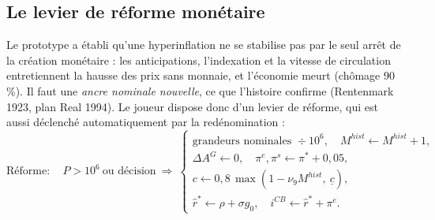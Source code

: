 \documentclass[11pt,a4paper]{article}
\begin{document}
\subsection{Le levier de réforme monétaire}
\label{sec:reforme}
Le prototype a établi qu'une hyperinflation ne se stabilise pas par le seul arrêt de la création monétaire : les anticipations, l'indexation et la vitesse de circulation entretiennent la hausse des prix sans monnaie, et l'économie meurt (chômage 90\,\%). Il faut une \emph{ancre nominale nouvelle}, ce que l'histoire confirme (Rentenmark 1923, plan Real 1994). Le joueur dispose donc d'un levier de réforme, qui est aussi déclenché automatiquement par la redénomination :
\begin{equation}
\text{Réforme} : \quad P > 10^6 \ \text{ou décision} \ \Rightarrow\ 
\begin{cases}
\text{grandeurs nominales } \div 10^6, \quad M^{hist} \leftarrow M^{hist}+1,\\
\Delta A^G \leftarrow 0, \quad \pi^e,\pi^s \leftarrow \pi^\ast + 0{,}05,\\
c \leftarrow 0{,}8\,\max(1-\nu_9 M^{hist},\ \underline c),\\
\hat r^\ast \leftarrow \rho+\sigma g_0, \quad i^{CB} \leftarrow \hat r^\ast + \pi^e .
\end{cases}
\label{eq:reform}
\end{equation}
\end{document}
